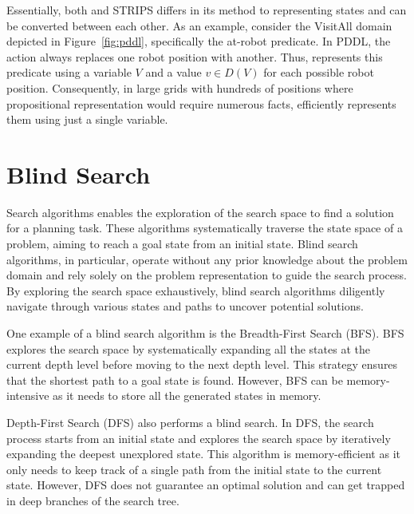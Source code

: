 Essentially, both \sas and STRIPS differs in its method to representing states and can be converted between each other. As an example, consider the VisitAll domain depicted in Figure~\ref{fig:pddl}, specifically the at-robot predicate. In PDDL, the action always replaces one robot position with another. Thus, \sas represents this predicate using a variable $V$ and a value $v \in D(V)$ for each possible robot position. Consequently, in large grids with hundreds of positions where propositional representation would require numerous facts, \sas efficiently represents them using just a single variable.

\section{Blind Search}
\label{sec:background_serchalgorithms}

Search algorithms enables the exploration of the search space to find a solution for a planning task. These algorithms systematically traverse the state space of a problem, aiming to reach a goal state from an initial state. Blind search algorithms, in particular, operate without any prior knowledge about the problem domain and rely solely on the problem representation to guide the search process. By exploring the search space exhaustively, blind search algorithms diligently navigate through various states and paths to uncover potential solutions.

One example of a blind search algorithm is the Breadth-First Search (BFS). BFS explores the search space by systematically expanding all the states at the current depth level before moving to the next depth level. This strategy ensures that the shortest path to a goal state is found. However, BFS can be memory-intensive as it needs to store all the generated states in memory.

Depth-First Search (DFS) also performs a blind search. In DFS, the search process starts from an initial state and explores the search space by iteratively expanding the deepest unexplored state. This algorithm is memory-efficient as it only needs to keep track of a single path from the initial state to the current state. However, DFS does not guarantee an optimal solution and can get trapped in deep branches of the search tree.

